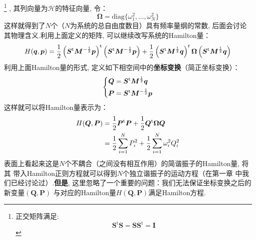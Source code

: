     \footnote{
        正交矩阵满足: 
    \begin{equation}
        \bm{S}^\mathrm{t}\bm{S} = \bm{SS}^\mathrm{t} = \bm{I}
    \end{equation}
    }
    , 其列向量为$\bm{\mathcal{H}}$的特征向量, 
    令：
    \begin{equation}
        \bm{\Omega} = \mathrm{diag} \{\omega_1^2, ..., \omega_N^2 \}
    \end{equation}
    这样就得到了$N$个（$N$为系统的总自由度数目）具有频率量纲的常数, 后面会讨论
    其物理含义.利用上面定义的矩阵, 可以继续改写系统的Hamilton量：
    \begin{equation}
        H(\bm{q},\bm{p}) = \frac{1}{2}\left(\bm{S}^{\mathrm{t}}\bm{M}^{-\frac{1}{2}}\bm{p}\right)^{\mathrm{t}}\left(\bm{S}^{\mathrm{t}}\bm{M}^{-\frac{1}{2}}\bm{p}\right) + 
        \frac{1}{2}\left(\bm{S}^{\mathrm{t}}\bm{M}^{\frac{1}{2}}\bm{q}\right)^{t}\bm{\Omega}\left(\bm{S}^{\mathrm{t}}\bm{M}^{\frac{1}{2}}\bm{q}\right)
    \end{equation}
    利用上面Hamilton量的形式, 定义如下相空间中的\textbf{坐标变换}（简正坐标变换）：
    \begin{equation}
        \left\{
        \begin{split}
            \bm{Q} &= \bm{S}^{\mathrm{t}}\bm{M}^{\frac{1}{2}}\bm{q}\\
            \bm{P} &= \bm{S}^{\mathrm{t}}\bm{M}^{-\frac{1}{2}}\bm{p}
        \end{split}
        \right.
        \label{normal mode transformation}
    \end{equation}
    这样就可以将Hamilton量表示为：
    \begin{equation}
        \begin{split}
        H(\bm{Q},\bm{P}) &= \frac{1}{2}\bm{P}^{\mathrm{t}}\bm{P} + \frac{1}{2}\bm{Q}^{\mathrm{t}}\bm{\Omega}\bm{Q}\\
        & = \frac{1}{2}\sum_{i=1}^{N}P_{i}^2 + \frac{1}{2}\sum_{i=1}^{N}\omega_{i}^2Q_{i}^{2}
        \end{split}
    \end{equation}
    表面上看起来这是$N$个不耦合（之间没有相互作用）的简谐振子的Hamilton量, 将其
    带入Hamilton正则方程就可以得到$N$个独立谐振子的运动方程（在第一章
    中我们已经讨论过）.\textbf{但是}, 
    这里忽略了一个重要的问题：我们无法保证坐标变换之后的新变量$(\bm{Q},\bm{P})$
    与对应的Hamilton量$H(\bm{Q},\bm{P})$满足Hamilton方程.

    \splitline

